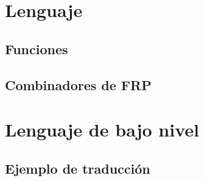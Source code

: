 


\section{Lenguaje \frob{}}


  \subsection{Funciones}
  
  \subsection{Combinadores de FRP}
  

\section{Lenguaje de bajo nivel}


\subsection{Ejemplo de traducción}


